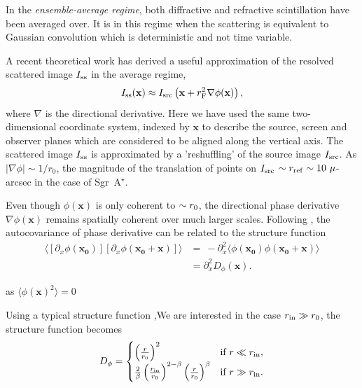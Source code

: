 In the \emph{ensemble-average regime}, both diffractive and refractive scintillation have been averaged over. It is in this regime when  the scattering is equivalent to Gaussian convolution which is deterministic and not time variable. 


A recent theoretical work \citep*{Johnson_2015a} has derived a useful approximation of the resolved scattered image $I_{\rm ss}$ in the average regime,
\begin{equation}\label{eq:scatterbrane}
I_{\rm ss}(\mathbf{x}) \approx I_{\rm src}\left(\mathbf{x} + r_{\rm F}^2 \nabla \phi(\mathbf{x})\right),
\end{equation}
where $\nabla$ is the directional derivative. Here we have used the same two-dimensional coordinate system, indexed by $\mathbf{x}$ to describe the source, screen and observer planes which are considered to be aligned along the vertical axis. The scattered image $I_{\rm ss}$ is approximated by a 'reshuffling' of the source image $I_{\rm src}$. As $|\nabla\phi| \sim 1/r_0$, the magnitude of the translation of points on $I_{\rm src}$ $\sim r_{\rm ref} \sim 10\ \mu$-arcsec in the case of Sgr~A$^\star$. 

Even though $\phi(\mathbf{x})$ is only coherent to $\sim r_{\rm 0}$, the directional phase derivative $\nabla \phi(\mathbf{x})$ remains spatially coherent over much larger scales. Following \citet*{Johnson_2015a}, the autocovariance of phase derivative can be related to the structure function
\begin{align}
\langle [ \partial_x \phi(\mathbf{x_0})] [ \partial_x \phi(\mathbf{x_0}+\mathbf{x})] \rangle &=\
-\partial^2_x \langle \phi(\mathbf{x_0}) \phi(\mathbf{x_0}+\mathbf{x}) \rangle \\
&= \partial_x^2 D_\phi(\mathbf{x}).
\end{align}

as $\langle \phi(\mathbf{x})^2 \rangle = 0$

Using a typical structure function \citep{johnson_dissertation},We are interested in the case $r_{\rm in} \gg r_0$, the structure function becomes \citep{johnson_dissertation}
\begin{equation*}
D_\phi =
\begin{cases}
\left( \frac{r}{r_0}\right)^2 & \text{if } r \ll r_{\rm in},\\
\frac{2}{\beta}\left( \frac{r_{\rm in}}{r_0}\right)^{2-\beta} \left( \frac{r}{r_0}\right)^\beta & \text{if } r \gg r_{\rm in}.
\end{cases}
\end{equation*}

